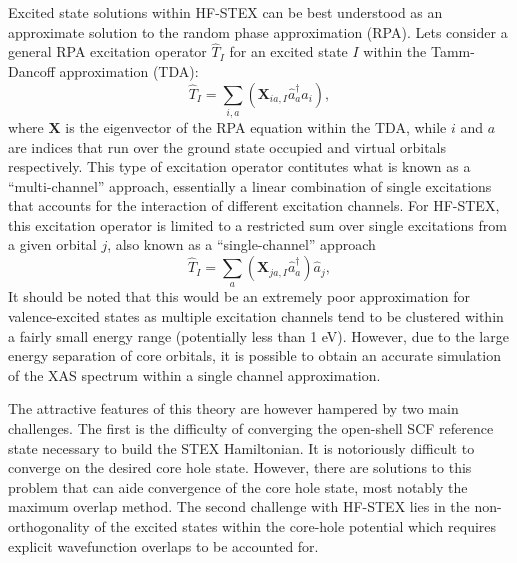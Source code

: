 \documentclass{article}
\begin{document}
Excited state solutions within HF-STEX can be best understood as an approximate solution to the random phase approximation (RPA).  Lets consider a general RPA excitation operator $\hat{T}_I$ for an excited state $I$ within the Tamm-Dancoff approximation (TDA):\cite{hirata_time-dependent_1999}
\begin{equation}
\hat{T}_I = \sum_{i,a} (\mathbf{X}_{ia,I}\hat{a}^{\dagger}_{a}\hat{a}_i),
\end{equation}
where $\mathbf{X}$ is the eigenvector of the RPA equation within the TDA, while $i$ and $a$ are indices that run over the ground state occupied and virtual orbitals respectively. This type of excitation operator contitutes what is known as a ``multi-channel'' approach, essentially a linear combination of single excitations that accounts for the interaction of different excitation channels. For HF-STEX, this excitation operator is limited to a restricted sum over single excitations from a given orbital $j$, also known as a ``single-channel'' approach
\begin{equation}
\hat{T}_I = \sum_{a} (\mathbf{X}_{ja,I}\hat{a}^{\dagger}_{a})\hat{a}_j,
\end{equation}
It should be noted that this would be an extremely poor approximation for valence-excited states as multiple excitation channels tend to be clustered within a fairly small energy range (potentially less than 1 eV). However, due to the large energy separation of core orbitals, it is possible to obtain an accurate simulation of the XAS spectrum within a single channel approximation. 

The attractive features of this theory are however hampered by two main challenges.  The first is the difficulty of converging the open-shell SCF reference state necessary to build the STEX Hamiltonian. It is notoriously difficult to converge on the desired core hole state. However, there are solutions to this problem that can aide convergence of the core hole state, most notably the maximum overlap method.\cite{besley_self-consistent-field_2009} The second challenge with HF-STEX lies in the non-orthogonality of the excited states within the core-hole potential which requires explicit wavefunction overlaps to be accounted for. 
\end{document}
